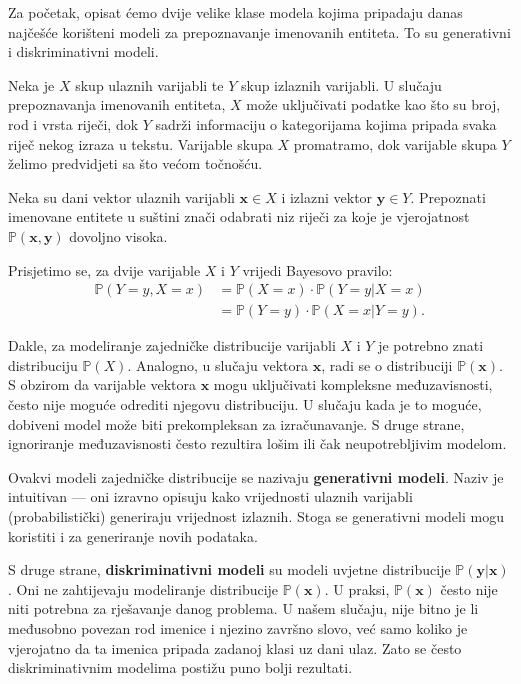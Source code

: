 \documentclass[a4paper,twoside,12pt]{memoir} %
\newcommand{\tb}{\textbf}
\begin{document}
	Za početak, opisat ćemo dvije velike klase modela kojima pripadaju danas najčešće korišteni modeli za prepoznavanje imenovanih entiteta. To su generativni i diskriminativni modeli.

	\bigskip

	Neka je $X$ skup ulaznih varijabli te $Y$ skup izlaznih varijabli. U slučaju prepoznavanja imenovanih entiteta, $X$ može uključivati podatke kao što su broj, rod i vrsta riječi, dok $Y$ sadrži informaciju o kategorijama kojima pripada svaka riječ nekog izraza u tekstu. Varijable skupa $X$ promatramo, dok varijable skupa $Y$ želimo predvidjeti sa što većom točnošću.

	Neka su dani vektor ulaznih varijabli $\mathbf{x} \in X$ i izlazni vektor $\mathbf{y} \in Y$. Prepoznati imenovane entitete u suštini znači odabrati niz riječi za koje je vjerojatnost $\mathbb{P}(\mathbf{x}, \mathbf{y})$ dovoljno visoka.

	\bigskip

	Prisjetimo se, za dvije varijable $X$ i $Y$ vrijedi Bayesovo pravilo:
	\begin{equation}
	\begin{split}
	\mathbb{P}(Y=y, X=x) &= \mathbb{P}(X=x) \cdot \mathbb{P}(Y=y | X=x) \\
	&= \mathbb{P}(Y=y) \cdot \mathbb{P}(X=x | Y=y).
	\end{split}\label{bayes_rule}
	\end{equation}

	Dakle, za modeliranje zajedničke distribucije varijabli $X$ i $Y$ je potrebno znati distribuciju $\mathbb{P}(X)$. Analogno, u slučaju vektora $\mathbf{x}$, radi se o distribuciji $\mathbb{P}(\mathbf{x})$. S obzirom da varijable vektora $\mathbf{x}$ mogu uključivati kompleksne međuzavisnosti, često nije moguće odrediti njegovu distribuciju. U slučaju kada je to moguće, dobiveni model može biti prekompleksan za izračunavanje. S druge strane, ignoriranje međuzavisnosti često rezultira lošim ili čak neupotrebljivim modelom.

	Ovakvi modeli zajedničke distribucije se nazivaju \tb{generativni modeli}. Naziv je intuitivan --- oni izravno opisuju kako vrijednosti ulaznih varijabli (probabilistički) generiraju vrijednost izlaznih. Stoga se generativni modeli mogu koristiti i za generiranje novih podataka.

	S druge strane, \tb{diskriminativni modeli} su modeli uvjetne distribucije $\mathbb{P}(\mathbf{y}|\mathbf{x})$. Oni ne zahtijevaju modeliranje distribucije $\mathbb{P}(\mathbf{x})$. U praksi, $\mathbb{P}(\mathbf{x})$ često nije niti potrebna za rješavanje danog problema. U našem slučaju, nije bitno je li međusobno povezan rod imenice i njezino završno slovo, već samo koliko je vjerojatno da ta imenica pripada zadanoj klasi uz dani ulaz. Zato se često diskriminativnim modelima postižu puno bolji rezultati.
\end{document}
